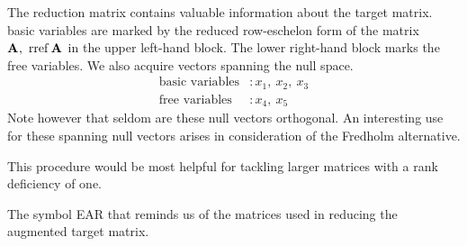 The reduction matrix contains valuable information about the target matrix. basic variables are marked by the reduced row-eschelon form of the matrix $\textbf{A}^{\mathrm{}},\ \operatorname{rref} \textbf{A}^{\mathrm{}}$ in the upper left-hand block. The lower right-hand block marks the free variables. We also acquire vectors spanning the null space. 
\begin{equation*}
\begin{split}
  \text{basic variables} &: x_{1},\ x_{2},\ x_{3} \\
  \text{free variables} &: x_{4},\ x_{5}
\end{split}
\end{equation*}
Note however that seldom are these null vectors orthogonal. An interesting use for these spanning null vectors arises in consideration of the Fredholm alternative.

This procedure would be most helpful for tackling larger matrices with a rank deficiency of one.

The symbol EAR that reminds us of the matrices used in reducing the augmented target matrix. 

\endinput